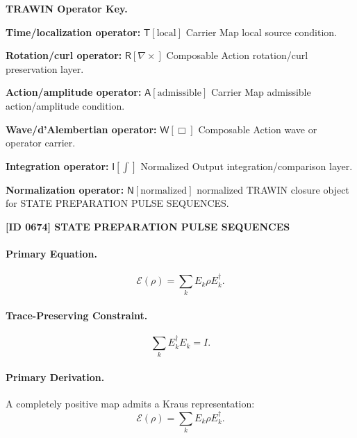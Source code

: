 \par\vspace{0.45\baselineskip}
\noindent\begin{minipage}[t]{\linewidth}
\begingroup
\small
\raggedright
\textbf{TRAWIN Operator Key.}\par
\noindent\textbf{Time/localization operator:} $\mathsf{T}\!\left[\mathrm{local}\right]$ Carrier Map local source condition.\par
\noindent\textbf{Rotation/curl operator:} $\mathsf{R}\!\left[\nabla\times\right]$ Composable Action rotation/curl preservation layer.\par
\noindent\textbf{Action/amplitude operator:} $\mathsf{A}\!\left[\mathrm{admissible}\right]$ Carrier Map admissible action/amplitude condition.\par
\noindent\textbf{Wave/d'Alembertian operator:} $\mathsf{W}\!\left[\Box\right]$ Composable Action wave or operator carrier.\par
\noindent\textbf{Integration operator:} $\mathsf{I}\!\left[\int\right]$ Normalized Output integration/comparison layer.\par
\noindent\textbf{Normalization operator:} $\mathsf{N}\!\left[\mathrm{normalized}\right]$ normalized TRAWIN closure object for STATE PREPARATION PULSE SEQUENCES.\par
\endgroup
\end{minipage}

\clearpage
\noindent\textbf{[ID 0674] STATE PREPARATION PULSE SEQUENCES}\par
\vspace{0.35em}
\paragraph{Primary Equation.}
\begin{equation}
\mathcal{E}(\rho)=\sum_k E_k\rho E_k^\dagger .
\end{equation}

\paragraph{Trace-Preserving Constraint.}
\begin{equation}
\sum_k E_k^\dagger E_k = I .
\end{equation}

\paragraph{Primary Derivation.}
A completely positive map admits a Kraus representation:
\begin{equation}
\mathcal{E}(\rho)=\sum_k E_k\rho E_k^\dagger .
\end{equation}

